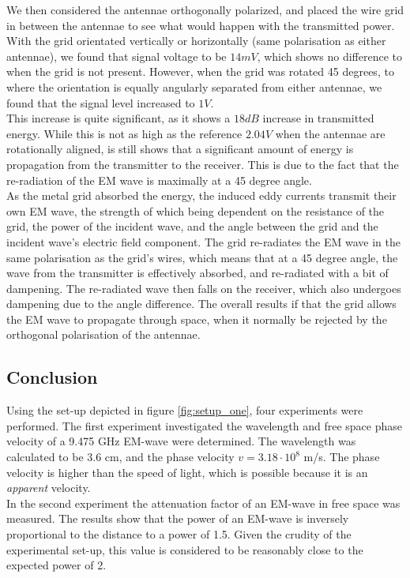 \documentclass[11pt,a4paper]{article}
\begin{document}
We then considered the antennae orthogonally polarized, and placed the wire grid in between the antennae to see what would happen with the transmitted power. With the grid orientated vertically or horizontally (same polarisation as either antennae), we found that signal voltage to be $14mV$, which shows no difference to when the grid is not present. However, when the grid was rotated 45 degrees, to where the orientation is equally angularly separated from either antennae, we found that the signal level increased to $1V$. \\

This increase is quite significant, as it shows a $18dB$ increase in transmitted energy. While this is not as high as the reference $2.04V$ when the antennae are rotationally aligned, is still shows that a significant amount of energy is propagation from the transmitter to the receiver. This is due to the fact that the re-radiation of the EM wave is maximally at a 45 degree angle.\\

As the metal grid absorbed the energy, the induced eddy currents transmit their own EM wave, the strength of which being dependent on the resistance of the grid, the power of the incident wave, and the angle between the grid and the incident wave's electric field component. The grid re-radiates the EM wave in the same polarisation as the grid's wires, which means that at a 45 degree angle, the wave from the transmitter is effectively absorbed, and re-radiated with a bit of dampening. The re-radiated wave then falls on the receiver, which also undergoes dampening due to the angle difference. The overall results if that the grid allows the EM wave to propagate through space, when it normally be rejected by the orthogonal polarisation of the antennae.

\subsection{Conclusion}
Using the set-up depicted in figure \ref{fig:setup_one}, four experiments were performed.
The first experiment investigated the wavelength and free space phase velocity of a 9.475 GHz EM-wave were determined.
The wavelength was calculated to be 3.6 cm, and the phase velocity $v = 3.18 \cdot 10^8$ m/s.
The phase velocity is higher than the speed of light, which is possible because it is an \emph{apparent} velocity.\\

In the second experiment the attenuation factor of an EM-wave in free space was measured.
The results show that the power of an EM-wave is inversely proportional to the distance to a power of 1.5.
Given the crudity of the experimental set-up, this value is considered to be reasonably close to the expected power of 2.\\
\end{document}
